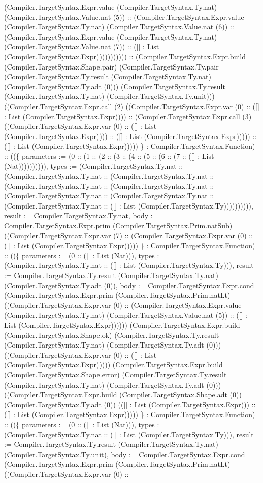 \documentclass[11pt]{article}
\begin{document}
(Compiler.TargetSyntax.Expr.value (Compiler.TargetSyntax.Ty.nat) (Compiler.TargetSyntax.Value.nat (5)) :: (Compiler.TargetSyntax.Expr.value (Compiler.TargetSyntax.Ty.nat) (Compiler.TargetSyntax.Value.nat (6)) :: (Compiler.TargetSyntax.Expr.value (Compiler.TargetSyntax.Ty.nat) (Compiler.TargetSyntax.Value.nat (7)) :: ([] : List (Compiler.TargetSyntax.Expr))))))))))) :: (Compiler.TargetSyntax.Expr.build (Compiler.TargetSyntax.Shape.pair) (Compiler.TargetSyntax.Ty.pair (Compiler.TargetSyntax.Ty.result (Compiler.TargetSyntax.Ty.nat) (Compiler.TargetSyntax.Ty.adt (0))) (Compiler.TargetSyntax.Ty.result (Compiler.TargetSyntax.Ty.nat) (Compiler.TargetSyntax.Ty.unit))) ((Compiler.TargetSyntax.Expr.call (2) ((Compiler.TargetSyntax.Expr.var (0) :: ([] : List (Compiler.TargetSyntax.Expr)))) :: (Compiler.TargetSyntax.Expr.call (3) ((Compiler.TargetSyntax.Expr.var (0) :: ([] : List (Compiler.TargetSyntax.Expr)))) :: ([] : List (Compiler.TargetSyntax.Expr))))) :: ([] : List (Compiler.TargetSyntax.Expr))))) \} : Compiler.TargetSyntax.Function) :: ((\{ parameters := (0 :: (1 :: (2 :: (3 :: (4 :: (5 :: (6 :: (7 :: ([] : List (Nat)))))))))), types := (Compiler.TargetSyntax.Ty.nat :: (Compiler.TargetSyntax.Ty.nat :: (Compiler.TargetSyntax.Ty.nat :: (Compiler.TargetSyntax.Ty.nat :: (Compiler.TargetSyntax.Ty.nat :: (Compiler.TargetSyntax.Ty.nat :: (Compiler.TargetSyntax.Ty.nat :: (Compiler.TargetSyntax.Ty.nat :: ([] : List (Compiler.TargetSyntax.Ty)))))))))), result := Compiler.TargetSyntax.Ty.nat, body := Compiler.TargetSyntax.Expr.prim (Compiler.TargetSyntax.Prim.natSub) ((Compiler.TargetSyntax.Expr.var (7) :: (Compiler.TargetSyntax.Expr.var (0) :: ([] : List (Compiler.TargetSyntax.Expr))))) \} : Compiler.TargetSyntax.Function) :: ((\{ parameters := (0 :: ([] : List (Nat))), types := (Compiler.TargetSyntax.Ty.nat :: ([] : List (Compiler.TargetSyntax.Ty))), result := Compiler.TargetSyntax.Ty.result (Compiler.TargetSyntax.Ty.nat) (Compiler.TargetSyntax.Ty.adt (0)), body := Compiler.TargetSyntax.Expr.cond (Compiler.TargetSyntax.Expr.prim (Compiler.TargetSyntax.Prim.natLt) ((Compiler.TargetSyntax.Expr.var (0) :: (Compiler.TargetSyntax.Expr.value (Compiler.TargetSyntax.Ty.nat) (Compiler.TargetSyntax.Value.nat (5)) :: ([] : List (Compiler.TargetSyntax.Expr)))))) (Compiler.TargetSyntax.Expr.build (Compiler.TargetSyntax.Shape.ok) (Compiler.TargetSyntax.Ty.result (Compiler.TargetSyntax.Ty.nat) (Compiler.TargetSyntax.Ty.adt (0))) ((Compiler.TargetSyntax.Expr.var (0) :: ([] : List (Compiler.TargetSyntax.Expr))))) (Compiler.TargetSyntax.Expr.build (Compiler.TargetSyntax.Shape.error) (Compiler.TargetSyntax.Ty.result (Compiler.TargetSyntax.Ty.nat) (Compiler.TargetSyntax.Ty.adt (0))) ((Compiler.TargetSyntax.Expr.build (Compiler.TargetSyntax.Shape.adt (0)) (Compiler.TargetSyntax.Ty.adt (0)) (([] : List (Compiler.TargetSyntax.Expr))) :: ([] : List (Compiler.TargetSyntax.Expr))))) \} : Compiler.TargetSyntax.Function) :: ((\{ parameters := (0 :: ([] : List (Nat))), types := (Compiler.TargetSyntax.Ty.nat :: ([] : List (Compiler.TargetSyntax.Ty))), result := Compiler.TargetSyntax.Ty.result (Compiler.TargetSyntax.Ty.nat) (Compiler.TargetSyntax.Ty.unit), body := Compiler.TargetSyntax.Expr.cond (Compiler.TargetSyntax.Expr.prim (Compiler.TargetSyntax.Prim.natLt) ((Compiler.TargetSyntax.Expr.var (0) :: 
\end{document}
